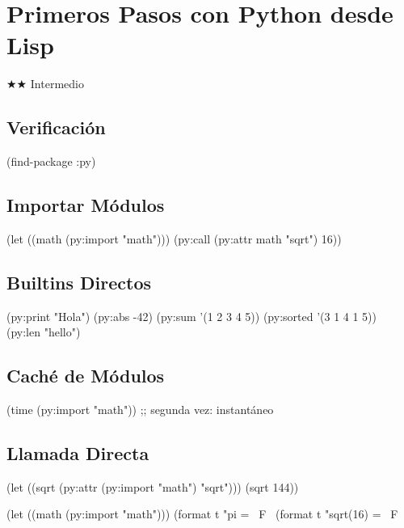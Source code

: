 \chapter{Primeros Pasos con Python desde Lisp}
\label{chap:python-firststeps}
{\huge$\bigstar$}{\huge$\bigstar$} Intermedio

\section{Verificación}
\begin{lispcode}
(find-package :py)
\end{lispcode}

\section{Importar Módulos}
\begin{lispcode}
(let ((math (py:import "math"))) (py:call (py:attr math "sqrt") 16))
\end{lispcode}

\section{Builtins Directos}
\begin{lispcode}
(py:print "Hola")
(py:abs -42)
(py:sum '(1 2 3 4 5))
(py:sorted '(3 1 4 1 5))
(py:len "hello")
\end{lispcode}

\section{Caché de Módulos}
\begin{lispcode}
(time (py:import "math"))  ;; segunda vez: instantáneo
\end{lispcode}

\section{Llamada Directa}
\begin{lispcode}
(let ((sqrt (py:attr (py:import "math") "sqrt"))) (sqrt 144))
\end{lispcode}

\begin{examplebox}[title=Usando math desde Lisp]
\begin{lispcode}
(let ((math (py:import "math")))
  (format t "pi = ~F~%
  (format t "sqrt(16) = ~F~%
\end{lispcode}
\end{examplebox}


